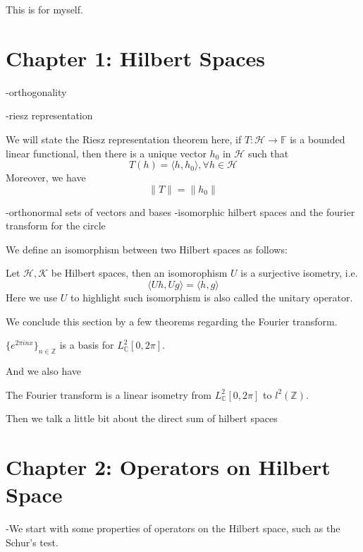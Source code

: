 This is for myself.

\section{Chapter 1: Hilbert Spaces}
-orthogonality

-riesz representation

We will state the Riesz representation theorem here, if $T:\mathcal{H}\to\mathbb{F}$ is a bounded linear functional, then there is a unique vector $h_0$ in $\mathcal{H}$ such that
\begin{equation*}
    T(h)=\langle h, h_0\rangle, \forall h\in\mathcal{H}
\end{equation*}
Moreover, we have
\begin{equation*}
    \|T\|=\|h_0\|
\end{equation*}


-orthonormal sets of vectors and bases
-isomorphic hilbert spaces and the fourier transform for the circle

We define an isomorphism between two Hilbert spaces as follows:
\begin{definition}
    Let $\mathcal{H}, \mathcal{K}$ be Hilbert spaces, then an isomorophism $U$ is a surjective isometry, i.e.
    \begin{equation*}
        \langle Uh, Ug\rangle=\langle h, g\rangle
    \end{equation*}
    Here we use $U$ to highlight such isomorphism is also called the unitary operator.
\end{definition}
We conclude this section by a few theorems regarding the Fourier transform.
\begin{proposition}
    $\{e^{2\pi inx}\}_{n\in\mathbb{Z}}$ is a basis for $L_\mathbb{C}^2[0,2\pi]$.
\end{proposition}
And we also have
\begin{theorem}
    The Fourier transform is a linear isometry from $L_\mathbb{C}^2[0,2\pi]$ to $l^2(\mathbb{Z})$.
\end{theorem}

Then we talk a little bit about the direct sum of hilbert spaces

\section{Chapter 2: Operators on Hilbert Space}
-We start with some properties of operators on the Hilbert space, such as the Schur's test.

